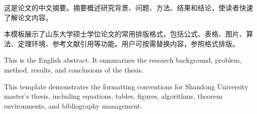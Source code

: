 %
%
%

\begin{cnabstract}

这是论文的中文摘要。摘要概述研究背景、问题、方法、结果和结论，使读者快速了解论文内容。

本模板展示了山东大学硕士学位论文的常用排版格式，包括公式、表格、图片、算法、定理环境、参考文献引用等功能。用户可按需替换内容，参照格式排版。


\end{cnabstract}

\begin{enabstract}

This is the English abstract. It summarizes the research background, problem, method, results, and conclusions of the thesis.

This template demonstrates the formatting conventions for Shandong University master's thesis, including equations, tables, figures, algorithms, theorem environments, and bibliography management.


\end{enabstract}
